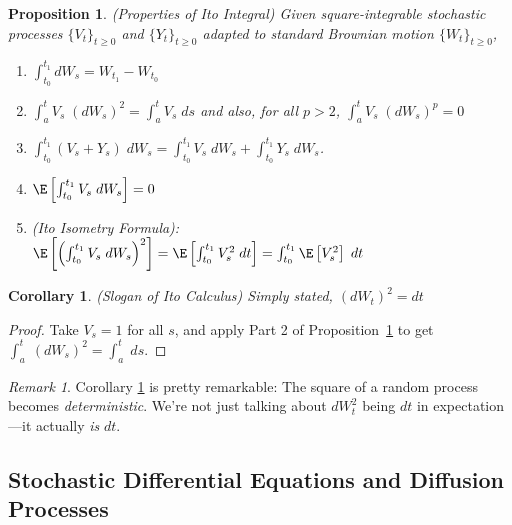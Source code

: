 \documentclass[12pt]{article}
\theoremstyle{plain}
\newtheorem{prop}[thm]{Proposition}
\newtheorem{cor}[thm]{Corollary}
\theoremstyle{definition}
\theoremstyle{remark}
\newtheorem*{rmk}{Remark}
\begin{document}
\begin{prop}\emph{(Properties of Ito Integral)}
\label{prop:itoprop}
Given square-integrable stochastic processes $\{V_t\}_{t\geq 0}$ and
$\{Y_t\}_{t\geq 0}$ adapted to standard Brownian motion
$\{W_t\}_{t\geq 0}$,
\begin{enumerate}
  \item $\int_{t_0}^{t_1} dW_s = W_{t_1} - W_{t_0}$
  \item
   $\int_a^t V_s \; (dW_s)^2 = \int_a^t V_s \; ds$
   and also, for all $p>2$,
   $\int_a^t V_s \; (dW_s)^p = 0$
  \item
    $\int_{t_0}^{t_1} (V_s + Y_s)\; dW_s = \int_{t_0}^{t_1} V_s \; dW_s +
    \int_{t_0}^{t_1} Y_s \; dW_s$.
  \item $\E\left[\int_{t_0}^{t_1} V_s \;dW_s \right] = 0$
  \item \emph{(Ito Isometry Formula)}:
    $\E\left[\left(\int_{t_0}^{t_1} V_s \;dW_s\right)^2 \right] =
    \E\left[\int_{t_0}^{t_1} V^2_s \;dt \right]=
    \int_{t_0}^{t_1} \E\left[V^2_s \right] \;dt$

\end{enumerate}
\end{prop}

\begin{cor}\emph{(Slogan of Ito Calculus)}
\label{cor:slogan}
Simply stated, $(dW_t)^2 = dt$
\end{cor}
\begin{proof}
Take $V_s=1$ for all $s$, and apply Part 2 of
Proposition~\ref{prop:itoprop} to get
$\int_a^t \;(dW_s)^2 = \int_a^t \; ds$.
\end{proof}
\begin{rmk}
Corollary \ref{cor:slogan} is pretty remarkable:
The square of a random process becomes \emph{deterministic}.
We're not just talking about $dW^2_t$ being $dt$ in expectation---it
actually \emph{is} $dt$.
\end{rmk}





\clearpage
\subsection{Stochastic Differential Equations and Diffusion Processes}
\end{document}
